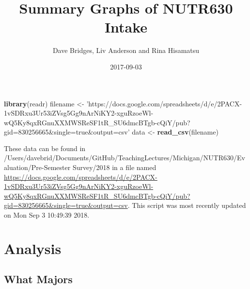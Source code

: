 \documentclass[]{article}
\title{Summary Graphs of NUTR630 Intake}
\author{Dave Bridges, Liv Anderson and Rina Hisamatsu}
\date{2017-09-03}
\newenvironment{Shaded}{\begin{snugshade}}{\end{snugshade}}
\newcommand{\KeywordTok}[1]{\textcolor[rgb]{0.13,0.29,0.53}{\textbf{#1}}}
\newcommand{\StringTok}[1]{\textcolor[rgb]{0.31,0.60,0.02}{#1}}
\newcommand{\NormalTok}[1]{#1}
\begin{document}
\maketitle

{
\setcounter{tocdepth}{2}
\tableofcontents
}
\begin{Shaded}
\begin{Highlighting}[]
\KeywordTok{library}\NormalTok{(readr)}
\NormalTok{filename <-}\StringTok{ 'https://docs.google.com/spreadsheets/d/e/2PACX-1vSDRxu3Ur53iZVsg5Gg9nArNiKY2-xguRzoeWl-wQ5Ky8qxRGnuXXMWSReSF1tR_SU6dmcBTgb-cQiY/pub?gid=830256665&single=true&output=csv'}
\NormalTok{data <-}\StringTok{ }\KeywordTok{read_csv}\NormalTok{(filename)}
\end{Highlighting}
\end{Shaded}

These data can be found in
/Users/davebrid/Documents/GitHub/TeachingLectures/Michigan/NUTR630/Evaluation/Pre-Semester
Survey/2018 in a file named
\url{https://docs.google.com/spreadsheets/d/e/2PACX-1vSDRxu3Ur53iZVsg5Gg9nArNiKY2-xguRzoeWl-wQ5Ky8qxRGnuXXMWSReSF1tR_SU6dmcBTgb-cQiY/pub?gid=830256665\&single=true\&output=csv}.
This script was most recently updated on Mon Sep 3 10:49:39 2018.

\section{Analysis}\label{analysis}

\subsection{What Majors}\label{what-majors}
\end{document}
